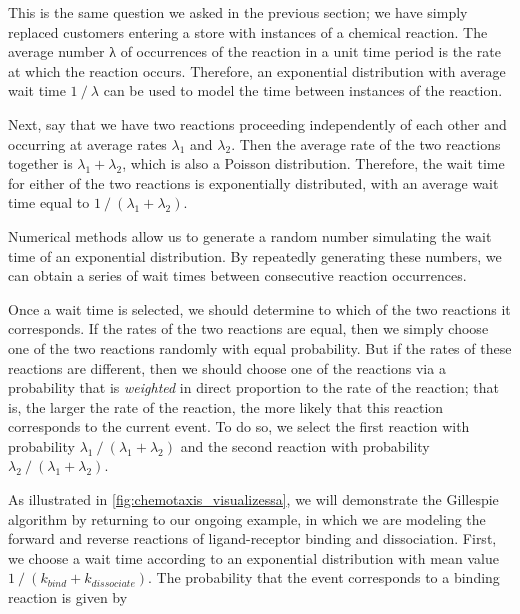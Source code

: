 This is the same question we asked in the previous section; we have simply replaced customers entering a store with instances of a chemical reaction. The average number λ of occurrences of the reaction in a unit time period is the rate at which the reaction occurs. Therefore, an exponential distribution with average wait time $1\mathbin{/}\lambda$ can be used to model the time between instances of the reaction.

Next, say that we have two reactions proceeding independently of each other and occurring at average rates $\lambda_1$ and $\lambda_2$. Then the average rate of the two reactions together is $\lambda_1 + \lambda_2$, which is also a Poisson distribution. Therefore, the wait time for either of the two reactions is exponentially distributed, with an average wait time equal to $1\mathbin{/}(\lambda_1 + \lambda_2)$.

Numerical methods allow us to generate a random number simulating the wait time of an exponential distribution. By repeatedly generating these numbers, we can obtain a series of wait times between consecutive reaction occurrences.

Once a wait time is selected, we should determine to which of the two reactions it corresponds. If the rates of the two reactions are equal, then we simply choose one of the two reactions randomly with equal probability. But if the rates of these reactions are different, then we should choose one of the reactions via a probability that is \textit{weighted} in direct proportion to the rate of the reaction; that is, the larger the rate of the reaction, the more likely that this reaction corresponds to the current event. To do so, we select the first reaction with probability $\lambda_1\mathbin{/}(\lambda_1 + \lambda_2)$ and the second reaction with probability $\lambda_2\mathbin{/}(\lambda_1 + \lambda_2)$.\\

\begin{qbox}\end{qbox}

As illustrated in \autoref{fig:chemotaxis_visualizessa}, we will demonstrate the Gillespie algorithm by returning to our ongoing example, in which we are modeling the forward and reverse reactions of ligand-receptor binding and dissociation. First, we choose a wait time according to an exponential distribution with mean value $1\mathbin{/}(k_{bind} + k_{dissociate})$. The probability that the event corresponds to a binding reaction is given by


